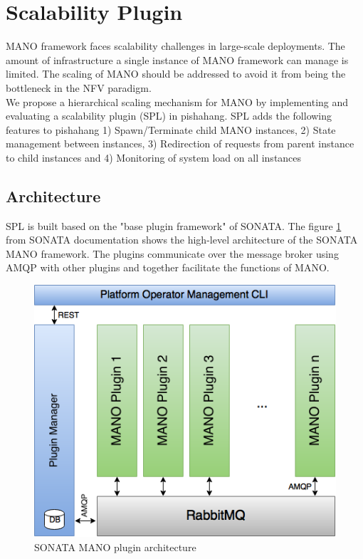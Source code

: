 \section{Scalability Plugin}
\label{scalingplugin}

MANO framework faces scalability challenges in large-scale deployments. The amount of infrastructure a single instance of MANO framework can manage is limited. The scaling of MANO should be addressed to avoid it from being the bottleneck in the NFV paradigm. \\

We propose a hierarchical scaling mechanism for MANO by implementing and evaluating a scalability plugin (SPL) in pishahang. SPL adds the following features to pishahang 1) Spawn/Terminate child MANO instances, 2) State management between instances, 3) Redirection of requests from parent instance to child instances and 4) Monitoring of system load on all instances

\subsection{Architecture}

SPL is built based on the "base plugin framework" of SONATA. The figure \ref{fig:pmdesign} from SONATA documentation shows the high-level architecture of the SONATA MANO framework. The plugins communicate over the message broker using AMQP with other plugins and together facilitate the functions of MANO.

\begin{figure}[h]
	\centering
	\includegraphics[width=0.7\linewidth]{figures/pm_design}
	\caption{SONATA MANO plugin architecture}
	\label{fig:pmdesign}
\end{figure}

